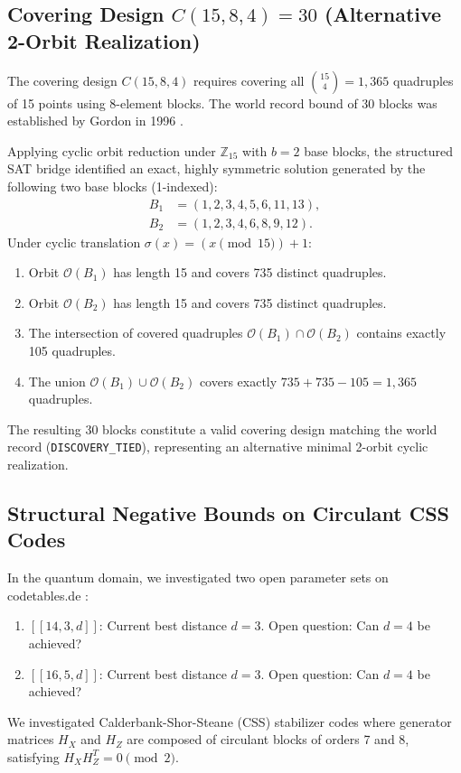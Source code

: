 \documentclass[11pt,a4paper]{article}
\begin{document}
\subsection{Covering Design $C(15, 8, 4) = 30$ (Alternative 2-Orbit Realization)}
\label{sec:c15_res}
The covering design $C(15, 8, 4)$ requires covering all $\binom{15}{4} = 1,365$ quadruples of 15 points using 8-element blocks. The world record bound of 30 blocks was established by Gordon in 1996 \cite{gordon2026ljcr}.

Applying cyclic orbit reduction under $\mathbb{Z}_{15}$ with $b=2$ base blocks, the structured SAT bridge identified an exact, highly symmetric solution generated by the following two base blocks (1-indexed):
\begin{align}
B_1 &= (1, 2, 3, 4, 5, 6, 11, 13), \label{eq:c15_base1} \\
B_2 &= (1, 2, 3, 4, 6, 8, 9, 12). \label{eq:c15_base2}
\end{align}
Under cyclic translation $\sigma(x) = (x \pmod{15}) + 1$:
\begin{enumerate}
    \item Orbit $\mathcal{O}(B_1)$ has length 15 and covers 735 distinct quadruples.
    \item Orbit $\mathcal{O}(B_2)$ has length 15 and covers 735 distinct quadruples.
    \item The intersection of covered quadruples $\mathcal{O}(B_1) \cap \mathcal{O}(B_2)$ contains exactly 105 quadruples.
    \item The union $\mathcal{O}(B_1) \cup \mathcal{O}(B_2)$ covers exactly $735 + 735 - 105 = 1,365$ quadruples.
\end{enumerate}
The resulting 30 blocks constitute a valid covering design matching the world record (\texttt{DISCOVERY\_TIED}), representing an alternative minimal 2-orbit cyclic realization.

\subsection{Structural Negative Bounds on Circulant CSS Codes}
\label{sec:circulant_bounds}
In the quantum domain, we investigated two open parameter sets on codetables.de \cite{grassl2026codetables}:
\begin{enumerate}
    \item $[[14, 3, d]]$: Current best distance $d=3$. Open question: Can $d=4$ be achieved?
    \item $[[16, 5, d]]$: Current best distance $d=3$. Open question: Can $d=4$ be achieved?
\end{enumerate}
We investigated Calderbank-Shor-Steane (CSS) stabilizer codes where generator matrices $H_X$ and $H_Z$ are composed of circulant blocks of orders 7 and 8, satisfying $H_X H_Z^T = 0 \pmod 2$.
\end{document}
